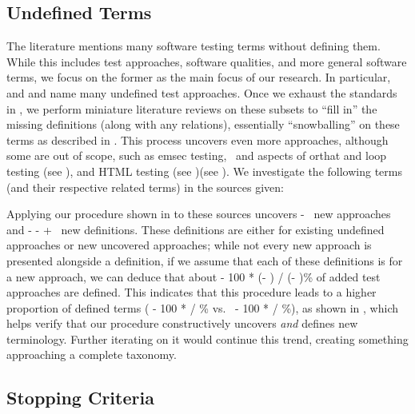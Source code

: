 \subsection{Undefined Terms}\label{undef-terms}

The literature mentions many software testing terms without defining them.
While this includes test approaches, software qualities, and more general
software terms, we focus on the former as the main focus of our research.
In particular, \ifnotpaper \citet{IEEE2022} and \citet{Firesmith2015} \else
    \cite{Firesmith2015} and \cite{IEEE2022} \fi name many undefined test
approaches. Once we exhaust the standards in , we
perform miniature literature reviews on these subsets to ``fill in'' the
missing definitions (along with any relations), essentially ``snowballing''
on these terms as described in . This process uncovers even more
approaches, although some are
out of scope, such as \acf{emsec} testing\ifnotpaper, \else\ and \fi
aspects of \acf{orthat} \ifnotpaper and loop testing (see ),
    and HTML testing (see )\else (see )\fi.
We investigate the following terms (and their respective related terms) in the
sources given:


\ifnotpaper
    Applying our procedure shown in  to these sources
    uncovers \the\numexpr \TotalAfter - \TotalBefore\relax\ new approaches and
    \the\numexpr \TotalAfter - \UndefAfter - \TotalBefore + \UndefBefore\relax\ new
    definitions. These definitions are either for existing undefined approaches or
    new uncovered approaches; while not every new approach is presented alongside
    a definition, if we assume that each of these definitions is for a new approach,
    we can deduce that about \the{} - 100 * (\UndefAfter - \UndefBefore) /
    (\TotalAfter - \TotalBefore)\relax\% of added test approaches are defined. This
    indicates that this procedure leads to a higher proportion of defined terms
    (\the{} - 100 * \UndefBefore / \TotalBefore\relax\% vs.~%
    \the{} - 100 * \UndefAfter / \TotalAfter\relax\%), as shown in
    , which helps verify that our procedure constructively
    uncovers \emph{and} defines new terminology. Further iterating on it would
    continue this trend, creating something approaching a complete taxonomy.

    
\fi

\subsection{Stopping Criteria}\label{stop-crit}

